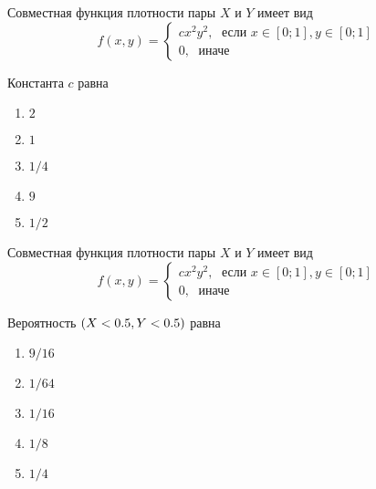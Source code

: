 \documentclass[t]{beamer}
\let\P\relax
\DeclareMathOperator{\P}{\mathbb{P}}
\begin{document}
 \begin{frame} \label{20} 
\begin{block}{20} 

Совместная функция плотности пары $X$ и $Y$ имеет вид
\[
f(x,y)=\begin{cases}
cx^2y^2, \; \text{ если } x\in[0;1], y\in [0;1] \\
0, \; \text{ иначе}
\end{cases}
\]

\vspace{0.5cm} 
 
 
Константа $c$ равна
 


 \end{block} 
\begin{enumerate} 
\item[] \hyperlink{20-No}{\beamergotobutton{} $2$
}
\item[] \hyperlink{20-No}{\beamergotobutton{} $1$}
\item[] \hyperlink{20-No}{\beamergotobutton{} $1/4$}
\item[] \hyperlink{20-Yes}{\beamergotobutton{} $9$}
\item[] \hyperlink{20-No}{\beamergotobutton{} $1/2$}
\end{enumerate} 
\end{frame} 


 \begin{frame} \label{21} 
\begin{block}{21} 

Совместная функция плотности пары $X$ и $Y$ имеет вид
\[
f(x,y)=\begin{cases}
cx^2y^2, \; \text{ если } x\in[0;1], y\in [0;1] \\
0, \; \text{ иначе}
\end{cases}
\]

\vspace{0.5cm} 
 
 
Вероятность $\P(X<0.5, Y<0.5)$ равна
 


 \end{block} 
\begin{enumerate} 
\item[] \hyperlink{21-No}{\beamergotobutton{} $9/16$
}
\item[] \hyperlink{21-Yes}{\beamergotobutton{} $1/64$}
\item[] \hyperlink{21-No}{\beamergotobutton{} $1/16$}
\item[] \hyperlink{21-No}{\beamergotobutton{} $1/8$}
\item[] \hyperlink{21-No}{\beamergotobutton{} $1/4$}
\end{enumerate} 
\end{frame} 
\end{document}

